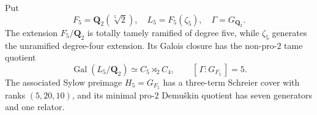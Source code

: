 \begin{theorem}
\label{thm:dyadic-f135-index-five-exact-certificate}
Put
\[
F_5=\mathbf Q_2(\sqrt[5]2),
\quad
L_5=F_5(\zeta_5),
\quad
\Gamma=G_{\mathbf Q_2}.
\]
The extension $F_5/\mathbf Q_2$
is totally tamely ramified
of degree five, while
$\zeta_5$ generates the
unramified degree-four
extension.  Its Galois
closure has the
non-pro-$2$ tame
quotient
\begin{equation}\label{eq:dyadic-f135-index-five-quotient}
\boxed{\quad
\operatorname{Gal}(L_5/\mathbf Q_2)
\simeq C_5\rtimes_{2}C_4,
\qquad
[\,\Gamma:G_{F_5}\,]=5.
\quad}
\end{equation}
The associated
Sylow preimage
$H_5=G_{F_5}$
has a three-term
Schreier cover
with ranks
$(5,20,10)$,
and its minimal
pro-$2$
Demu\v{s}kin quotient
has seven generators
and one relator.


\end{theorem}
